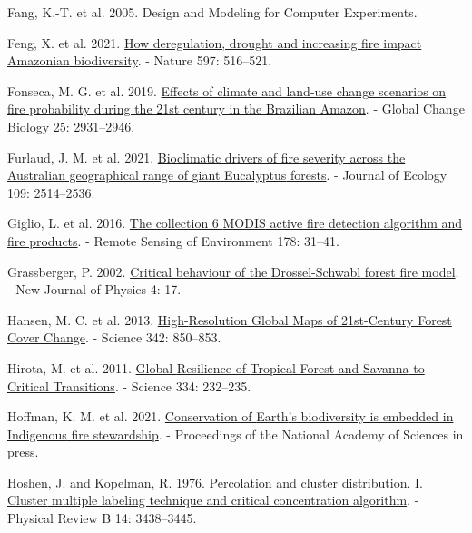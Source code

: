 \documentclass[
]{article}
\newlength{\cslhangindent}
\newenvironment{CSLReferences}[2] %
 {\begin{list}{}{%
  \setlength{\itemindent}{0pt}
  \setlength{\leftmargin}{0pt}
  \setlength{\parsep}{0pt}
  \ifodd #1
   \setlength{\leftmargin}{\cslhangindent}
   \setlength{\itemindent}{-1\cslhangindent}
  \fi
  \setlength{\itemsep}{#2\baselineskip}}}
 {\end{list}}
\begin{document}
\begin{CSLReferences}{1}{1}
Fang, K.-T. et al. 2005. {Design and Modeling for Computer Experiments}.

Feng, X. et al. 2021.
\href{https://doi.org/10.1038/s41586-021-03876-7}{How deregulation,
drought and increasing fire impact {Amazonian} biodiversity}. - Nature
597: 516--521.

Fonseca, M. G. et al. 2019.
\href{https://doi.org/10.1111/gcb.14709}{Effects of climate and land-use
change scenarios on fire probability during the 21st century in the
{Brazilian Amazon}}. - Global Change Biology 25: 2931--2946.

Furlaud, J. M. et al. 2021.
\href{https://doi.org/10.1111/1365-2745.13663}{Bioclimatic drivers of
fire severity across the {Australian} geographical range of giant
{Eucalyptus} forests}. - Journal of Ecology 109: 2514--2536.

Giglio, L. et al. 2016.
\href{https://doi.org/10.1016/j.rse.2016.02.054}{The collection 6
{MODIS} active fire detection algorithm and fire products}. - Remote
Sensing of Environment 178: 31--41.

Grassberger, P. 2002.
\href{https://doi.org/10.1088/1367-2630/4/1/317}{Critical behaviour of
the {Drossel-Schwabl} forest fire model}. - New Journal of Physics 4:
17.

Hansen, M. C. et al. 2013.
\href{https://doi.org/10.1126/science.1244693}{High-{Resolution Global
Maps} of 21st-{Century Forest Cover Change}}. - Science 342: 850--853.

Hirota, M. et al. 2011.
\href{https://doi.org/10.1126/science.1210657}{Global {Resilience} of
{Tropical Forest} and {Savanna} to {Critical Transitions}}. - Science
334: 232--235.

Hoffman, K. M. et al. 2021.
\href{https://doi.org/10.1073/pnas.2105073118}{Conservation of {Earth}'s
biodiversity is embedded in {Indigenous} fire stewardship}. -
Proceedings of the National Academy of Sciences in press.

Hoshen, J. and Kopelman, R. 1976.
\href{https://doi.org/10.1103/PhysRevB.14.3438}{Percolation and cluster
distribution. {I}. {Cluster} multiple labeling technique and critical
concentration algorithm}. - Physical Review B 14: 3438--3445.


\end{CSLReferences}
\end{document}
